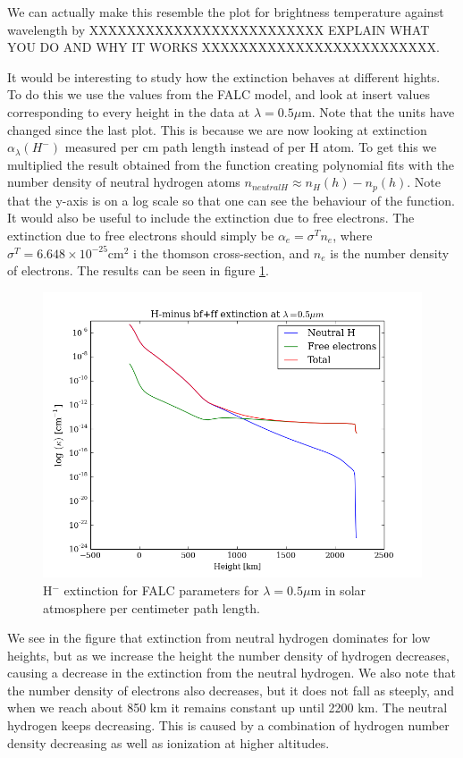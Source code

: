 \documentclass{aa}   %
\begin{document}
We can actually make this resemble the plot for brightness temperature against wavelength by XXXXXXXXXXXXXXXXXXXXXXXXX EXPLAIN WHAT YOU DO  AND WHY IT WORKS XXXXXXXXXXXXXXXXXXXXXXXXX.

It would be interesting to study how the extinction behaves at different hights.
To do this we use the values from the FALC model, and look at insert values corresponding to every height in the data at $\lambda = 0.5 \mu$m.  Note that the units have changed since the last plot. This is because we are now looking at extinction $\alpha_\lambda(H^-)$ measured per cm path length instead of per H atom. To get this we multiplied the result obtained from the function creating polynomial fits with the number density of neutral hydrogen atoms $n_{neutral H} \approx n_H(h) - n_p(h)$. Note that the y-axis is on a log scale so that one can see the behaviour of the function. It would also be useful to include the extinction due to free electrons. The extinction due to free electrons should simply be $\alpha_e = \sigma^T n_e$, where $\sigma^T = 6.648\times 10^{-25}$cm$^2$ i the thomson cross-section, and $n_e$ is the number density of electrons. 
The results can be seen in figure \ref{extinc_5000}.

\begin{figure}
 \includegraphics[width=.49\textwidth]{extinc_5000.png}
 \caption{H$^-$ extinction for FALC parameters for $\lambda = 0.5\mu$m in solar atmosphere per centimeter path length.}
 \label{extinc_5000} 
\end{figure}
We see in the figure that extinction from neutral hydrogen dominates for low heights, but as we increase the height the number density of hydrogen decreases, causing a decrease in the extinction from the neutral hydrogen. We also note that the number density of electrons also decreases, but it does not fall as steeply, and when we reach about 850 km it remains constant up until 2200 km. The neutral hydrogen keeps decreasing. This is caused by a combination of hydrogen number density decreasing as well as ionization at higher altitudes. 
\end{document}
